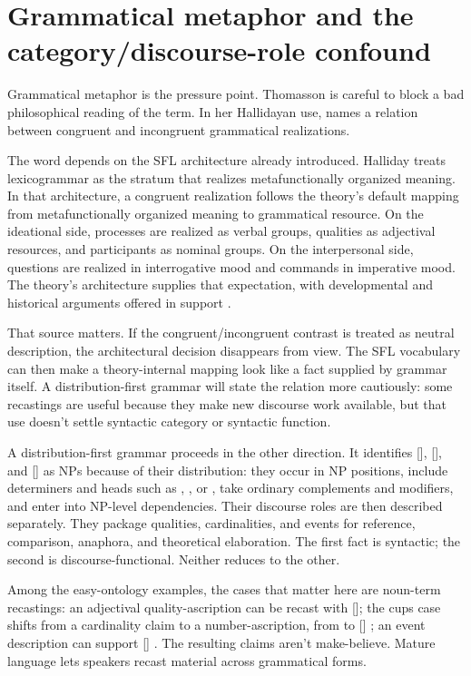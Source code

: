 \documentclass[12pt]{article}
\begin{document}
\section{Grammatical metaphor and the category/discourse-role confound}
Grammatical metaphor is the pressure point. Thomasson is careful to block a bad philosophical reading of the term. In her Hallidayan use,  names a relation between congruent and incongruent grammatical realizations.

The word  depends on the SFL architecture already introduced. Halliday treats lexicogrammar as the stratum that realizes metafunctionally organized meaning. In that architecture, a congruent realization follows the theory's default mapping from metafunctionally organized meaning to grammatical resource. On the ideational side, processes are realized as verbal groups, qualities as adjectival resources, and participants as nominal groups. On the interpersonal side, questions are realized in interrogative mood and commands in imperative mood. The theory's architecture supplies that expectation, with developmental and historical arguments offered in support \citep[659--665, 707--713]{hallidayMatthiessen2014introduction}.

That source matters. If the congruent/incongruent contrast is treated as neutral description, the architectural decision disappears from view. The SFL vocabulary can then make a theory-internal mapping look like a fact supplied by grammar itself. A distribution-first grammar will state the relation more cautiously: some recastings are useful because they make new discourse work available, but that use doesn't settle syntactic category or syntactic function.

A distribution-first grammar proceeds in the other direction. It identifies [], [], and [] as NPs because of their distribution: they occur in NP positions, include determiners and heads such as , , or , take ordinary complements and modifiers, and enter into NP-level dependencies. Their discourse roles are then described separately. They package qualities, cardinalities, and events for reference, comparison, anaphora, and theoretical elaboration. The first fact is syntactic; the second is discourse-functional. Neither reduces to the other.

Among the easy-ontology examples, the cases that matter here are noun-term recastings: an adjectival quality-ascription can be recast with []; the cups case shifts from a cardinality claim to a number-ascription, from  to [] ; an event description can support [] \citep[154, 169--179]{thomasson2025rethink}. The resulting claims aren't make-believe. Mature language lets speakers recast material across grammatical forms.
\end{document}
